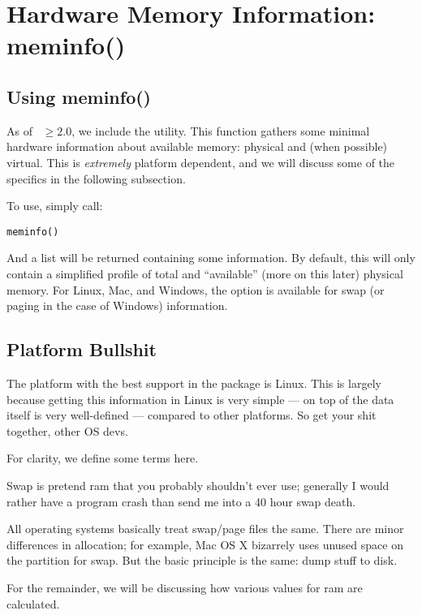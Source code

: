 \section{Hardware Memory Information: meminfo()}

\subsection{Using meminfo()}

As of ~$\geq 2.0$, we include the  utility.  This function gathers some minimal hardware information about available memory: physical and (when possible) virtual.  This is \emph{extremely} platform dependent, and we will discuss some of the specifics in the following subsection.  

To use, simply call:
\begin{lstlisting}
meminfo()
\end{lstlisting}

And a list will be returned containing some information.  By default, this will only contain a simplified profile of total and ``available'' (more on this later) physical memory.  For Linux, Mac, and Windows, the option is available for swap (or paging in the case of Windows) information.  




\subsection{Platform Bullshit}

The platform with the best support in the  package is Linux.  This is largely because getting this information in Linux is very simple --- on top of the data itself is very well-defined --- compared to other platforms.  So get your shit together, other OS devs.

For clarity, we define some terms here.

Swap is pretend ram that you probably shouldn't ever use; generally I would rather have a program crash than send me into a 40 hour swap death.

All operating systems basically treat swap/page files the same.  There are minor differences in allocation; for example, Mac OS X bizarrely uses unused space on the  partition for swap.  But the basic principle is the same: dump stuff to disk.

For the remainder, we will be discussing how various values for ram are calculated.



